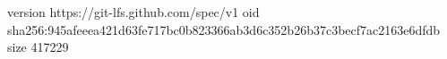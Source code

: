 version https://git-lfs.github.com/spec/v1
oid sha256:945afeeea421d63fe717bc0b823366ab3d6c352b26b37c3becf7ac2163e6dfdb
size 417229
